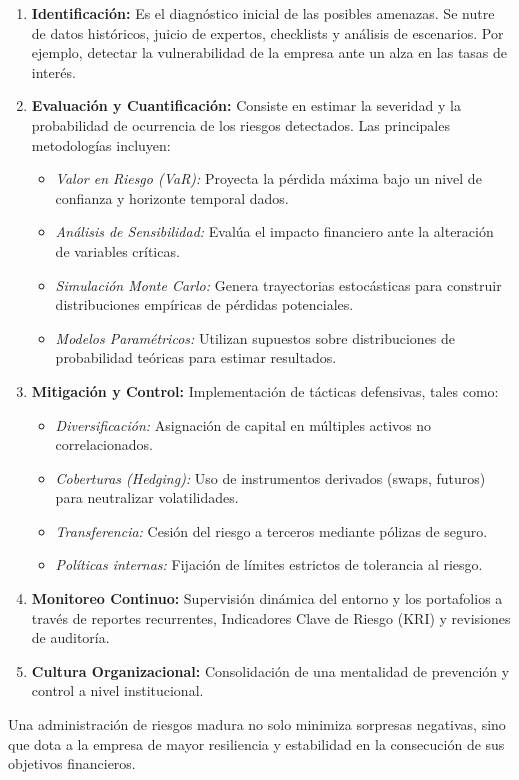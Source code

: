 \begin{enumerate}[label=\textcolor{azulp}{\textbf{\arabic*.}}, leftmargin=0.8cm]
    \item \textbf{Identificación:} Es el diagnóstico inicial de las posibles amenazas. Se nutre de datos históricos, juicio de expertos, checklists y análisis de escenarios. Por ejemplo, detectar la vulnerabilidad de la empresa ante un alza en las tasas de interés.
    
    \item \textbf{Evaluación y Cuantificación:} Consiste en estimar la severidad y la probabilidad de ocurrencia de los riesgos detectados. Las principales metodologías incluyen:
    \begin{itemize}[label=-]
        \item \textit{Valor en Riesgo (VaR):} Proyecta la pérdida máxima bajo un nivel de confianza y horizonte temporal dados.
        \item \textit{Análisis de Sensibilidad:} Evalúa el impacto financiero ante la alteración de variables críticas.
        \item \textit{Simulación Monte Carlo:} Genera trayectorias estocásticas para construir distribuciones empíricas de pérdidas potenciales.
        \item \textit{Modelos Paramétricos:} Utilizan supuestos sobre distribuciones de probabilidad teóricas para estimar resultados.
    \end{itemize}
    
    \item \textbf{Mitigación y Control:} Implementación de tácticas defensivas, tales como:
    \begin{itemize}[label=-]
        \item \textit{Diversificación:} Asignación de capital en múltiples activos no correlacionados.
        \item \textit{Coberturas (Hedging):} Uso de instrumentos derivados (swaps, futuros) para neutralizar volatilidades.
        \item \textit{Transferencia:} Cesión del riesgo a terceros mediante pólizas de seguro.
        \item \textit{Políticas internas:} Fijación de límites estrictos de tolerancia al riesgo.
    \end{itemize}
    
    \item \textbf{Monitoreo Continuo:} Supervisión dinámica del entorno y los portafolios a través de reportes recurrentes, Indicadores Clave de Riesgo (KRI) y revisiones de auditoría.
    
    \item \textbf{Cultura Organizacional:} Consolidación de una mentalidad de prevención y control a nivel institucional. 
\end{enumerate}

\vspace{0.3cm}
\noindent Una administración de riesgos madura no solo minimiza sorpresas negativas, sino que dota a la empresa de mayor resiliencia y estabilidad en la consecución de sus objetivos financieros.
